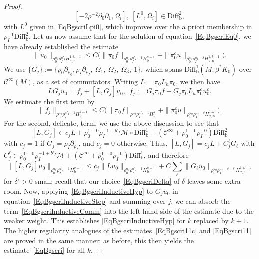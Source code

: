 \documentclass[reqno,11pt,letterpaper]{amsart}
\numberwithin{equation}{section}
\numberwithin{figure}{section}
\theoremstyle{definition}
\theoremstyle{remark}
\newcommand{\mc}{\mathcal}
\newcommand{\cC}{\mc C}
\newcommand{\cM}{\mc M}
\newcommand{\ms}{\mathscr}
\newcommand{\scri}{\ms I}
\newcommand{\pa}{\partial}
\newcommand{\bop}{{\mathrm{b}}}
\newcommand{\Diff}{\mathrm{Diff}}
\newcommand{\Diffb}{\Diff_\bop}
\newcommand{\CI}{\cC^\infty}
\newcommand{\Hb}{H_{\bop}}
\newcommand{\Hscrib}{H_{\scri,\bop}}
\begin{document}
\begin{proof}
  \[
    [-2\rho^{-2}\pa_0\pa_1, \Omega_i ],\ [ L^0, \Omega_i ] \in \Diffb^2,
  \]
  with $L^0$ given in \eqref{EqBgscriLpi0}, which improves over the a priori membership in $\rho_I^{-1}\Diffb^2$. Let us now assume that for the solution of equation~\eqref{EqBgscriEq0}, we have already established the estimate
  \begin{equation}
  \label{EqBgscriInductiveHyp}
    \| u_0 \|_{\rho_0^{a_0}\rho_I^{a'_I}\Hscrib^{1,k-1}} \leq C\bigl(\|\pi_0 f\|_{\rho_0^{a_0}\rho_I^{a'_I-1}\Hb^{k-1}} + \| \pi_0^c u\|_{\rho_0^{a_0}\rho_I^{a_I-\delta}\Hscrib^{1,k-1}}\bigr).
  \end{equation}
  We use $\{G_j\}:=\{\rho_0\pa_{\rho_0}, \rho_I\pa_{\rho_I},\ \Omega_1,\ \Omega_2,\ \Omega_3,\ 1\}$, which spans $\Diffb^1(M;\beta^*K_0)$ over $\CI(M)$, as a set of commutators. Writing $L=\pi_0 L_h\pi_0$, we then have
  \begin{equation}
  \label{EqBgscriInductiveStep}
    L G_j u_0 = f_j+[L,G_j]u_0,\ \ f_j := G_j\pi_0 f - G_j\pi_0 L_h\pi_0^c u_0^c.
  \end{equation}
  We estimate the first term by
  \[
    \|f_j\|_{\rho_0^{a_0}\rho_I^{a'_I-1}\Hb^{k-1}} \leq C\bigl(\|\pi_0 f\|_{\rho_0^{a_0}\rho_I^{a'_I-1}\Hb^k} + \|\pi_0^c u\|_{\rho_0^{a_0}\rho_I^{a_I-\delta}\Hscrib^{1,k}}\bigr).
  \]
  For the second, delicate, term, we use the above discussion to see that
  \begin{equation}
  \label{EqBgscriComm}
    [L,G_j] \in c_j L + \rho_0^{1-0}\rho_I^{-1+b'_I}\cM\circ\Diffb^1 + (\CI+\rho_0^{1-0}\rho_I^{-0})\Diffb^2
  \end{equation}
  with $c_j=1$ if $G_j=\rho_I\pa_{\rho_I}$, and $c_j=0$ otherwise. Thus, $[L,G_j]=c_j L + C_j^\ell G_\ell$ with $C_j^\ell\in\rho_0^{1-0}\rho_I^{-1+b'_I}\cM + (\CI+\rho_0^{1-0}\rho_I^{-0})\Diffb^1$, and therefore
  \begin{equation}
  \label{EqBgscriInductiveComm}
    \|[L,G_j]u_0\|_{\rho_0^{a_0}\rho_I^{a'_I-1}\Hb^{k-1}} \leq c_j\| L u_0 \|_{\rho_0^{a_0}\rho_I^{a'_I-1}\Hb^{k-1}} + C \sum_\ell \| G_\ell u_0 \|_{\rho_0^{a_0}\rho_I^{a_I-\delta-\delta'}\Hscrib^{1,k-1}}
  \end{equation}
  for $\delta'>0$ small; recall that our choice~\eqref{EqBgscriDelta} of $\delta$ leaves some extra room. Now, applying~\eqref{EqBgscriInductiveHyp} to $G_j u_0$ in equation~\eqref{EqBgscriInductiveStep} and summing over $j$, we can absorb the term~\eqref{EqBgscriInductiveComm} into the left hand side of the estimate due to the weaker weight. This establishes \eqref{EqBgscriInductiveHyp} for $k$ replaced by $k+1$. The higher regularity analogues of the estimates~\eqref{EqBgscri11c} and \eqref{EqBgscri11} are proved in the same manner; as before, this then yields the estimate~\eqref{EqBgscri} for all $k$.
\end{proof}
\end{document}
